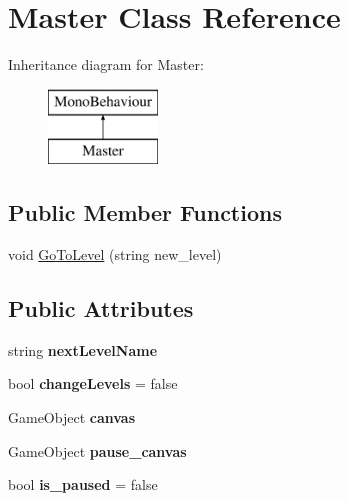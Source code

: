 \hypertarget{class_master}{}\section{Master Class Reference}
\label{class_master}
Inheritance diagram for Master\+:\begin{figure}[H]
\begin{center}
\leavevmode
\includegraphics[height=2.000000cm]{class_master}
\end{center}
\end{figure}
\subsection*{Public Member Functions}
\begin{DoxyCompactItemize}
\item 
void \mbox{\hyperlink{class_master_a4039986f86838df0020f147b0a049fb3}{Go\+To\+Level}} (string new\+\_\+level)
\end{DoxyCompactItemize}
\subsection*{Public Attributes}
\begin{DoxyCompactItemize}
\item 
\mbox{\label{class_master_aad1e3f27fbc3d5eb7558c1a3be30403a}} 
string {\bfseries next\+Level\+Name}
\item 
\mbox{\label{class_master_a003c805e3e5482dfa1f06bbc38c68cf3}} 
bool {\bfseries change\+Levels} = false
\item 
\mbox{\label{class_master_af2e2577e4b27f9136d5cea49361210e3}} 
Game\+Object {\bfseries canvas}
\item 
\mbox{\label{class_master_a769b71cec133ca2f3787482fe82c0706}} 
Game\+Object {\bfseries pause\+\_\+canvas}
\item 
\mbox{\label{class_master_a5860734442f094d65b499ae1e0d6de11}} 
bool {\bfseries is\+\_\+paused} = false
\end{DoxyCompactItemize}


